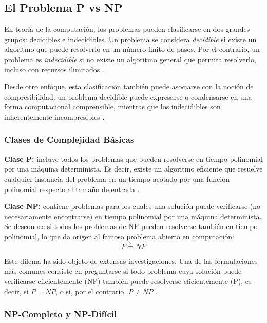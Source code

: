 \documentclass[12pt,titlepage,twoside,openright]{book}
\begin{document}
\subsection{El Problema P vs NP}

En teoría de la computación, los problemas pueden clasificarse en dos grandes grupos: decidibles e indecidibles. Un problema se considera \textit{decidible} si existe un algoritmo que puede resolverlo en un número finito de pasos. Por el contrario, un problema es \textit{indecidible} si no existe un algoritmo general que permita resolverlo, incluso con recursos ilimitados \citep{maldonado2013problema}.

Desde otro enfoque, esta clasificación también puede asociarse con la noción de compresibilidad: un problema decidible puede expresarse o condensarse en una forma computacional comprensible, mientras que los indecidibles son inherentemente incompresibles \citep{maldonado2013problema}.

\subsubsection{Clases de Complejidad Básicas}

\textbf{Clase P:} incluye todos los problemas que pueden resolverse en tiempo polinomial por una máquina determinista. Es decir, existe un algoritmo eficiente que resuelve cualquier instancia del problema en un tiempo acotado por una función polinomial respecto al tamaño de entrada \citep{sipser2012introduction}.

\textbf{Clase NP:} contiene problemas para los cuales una solución puede verificarse (no necesariamente encontrarse) en tiempo polinomial por una máquina determinista. Se desconoce si todos los problemas de NP pueden resolverse también en tiempo polinomial, lo que da origen al famoso problema abierto en computación: 
\begin{equation}
P \stackrel{?}{=} NP
\end{equation}

Este dilema ha sido objeto de extensas investigaciones. Una de las formulaciones más comunes consiste en preguntarse si todo problema cuya solución puede verificarse eficientemente (NP) también puede resolverse eficientemente (P), es decir, si $P = NP$, o si, por el contrario, $P \neq NP$ \citep{lipton2010p}.

\subsubsection{NP-Completo y NP-Difícil}
\end{document}
